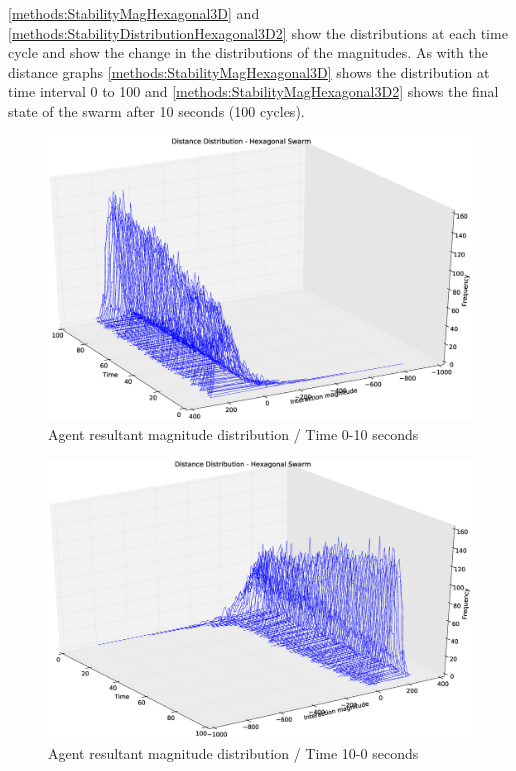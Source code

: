 \autoref{methods:StabilityMagHexagonal3D} and \ref{methods:StabilityDistributionHexagonal3D2} show the distributions at each time cycle and show the change in the distributions of the magnitudes. As with the distance graphs \autoref{methods:StabilityMagHexagonal3D} shows the distribution at time interval 0 to 100 and \autoref{methods:StabilityMagHexagonal3D2} shows the final state of the swarm after 10 seconds (100 cycles).

\begin{figure}[H]
\begin{center}
\includegraphics[width=13cm]{CHAPTER-5/figures/StabilityMagHexagonal3D}
\end{center}
\caption{Agent resultant magnitude distribution / Time 0-10 seconds\label{methods:StabilityMagHexagonal3D}}
\end{figure}

\begin{figure}[H]
\begin{center}
\includegraphics[width=13cm]{CHAPTER-5/figures/StabilityMagHexagonal3D2}
\end{center}
\caption{Agent resultant magnitude distribution / Time 10-0 seconds\label{methods:StabilityMagHexagonal3D2}}
\end{figure}

